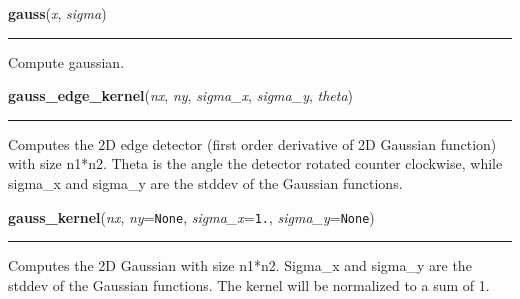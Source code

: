     \label{multireg:edge_detect:gauss}
    \vspace{0.5ex}

    \begin{boxedminipage}{\textwidth}

    \raggedright \textbf{gauss}(\textit{x}, \textit{sigma})

    \vspace{-1.5ex}

    \rule{\textwidth}{0.5\fboxrule}
    Compute gaussian.

    \vspace{1ex}

    \end{boxedminipage}

    \label{multireg:edge_detect:gauss_edge_kernel}
    \vspace{0.5ex}

    \begin{boxedminipage}{\textwidth}

    \raggedright \textbf{gauss\_edge\_kernel}(\textit{nx}, \textit{ny}, \textit{sigma\_x}, \textit{sigma\_y}, \textit{theta})

    \vspace{-1.5ex}

    \rule{\textwidth}{0.5\fboxrule}
    Computes the 2D edge detector (first order derivative of 2D Gaussian 
    function) with size n1*n2. Theta is the angle the detector rotated 
    counter clockwise, while sigma\_x and sigma\_y are the stddev of the 
    Gaussian functions.

    \vspace{1ex}

    \end{boxedminipage}

    \label{multireg:edge_detect:gauss_kernel}
    \vspace{0.5ex}

    \begin{boxedminipage}{\textwidth}

    \raggedright \textbf{gauss\_kernel}(\textit{nx}, \textit{ny}=\texttt{N\-o\-n\-e\-}, \textit{sigma\_x}=\texttt{1\-.\-}, \textit{sigma\_y}=\texttt{N\-o\-n\-e\-})

    \vspace{-1.5ex}

    \rule{\textwidth}{0.5\fboxrule}
    Computes the 2D Gaussian with size n1*n2. Sigma\_x and sigma\_y are 
    the stddev of the Gaussian functions. The kernel will be normalized 
    to a sum of 1.

    \vspace{1ex}

    \end{boxedminipage}

